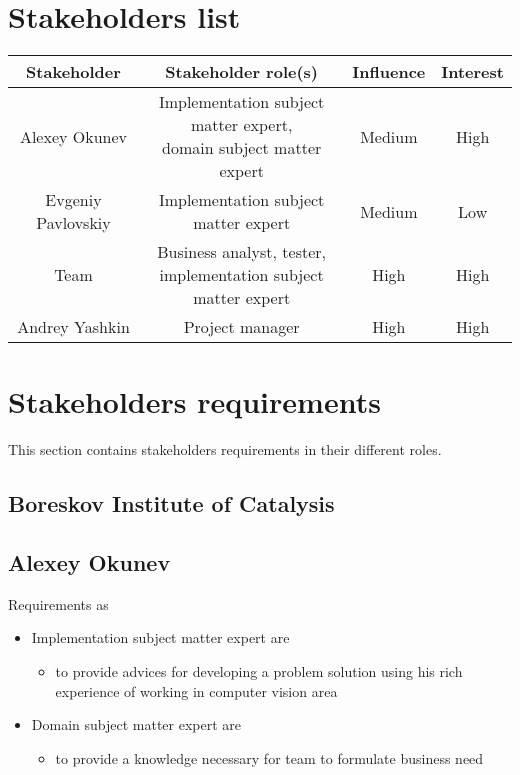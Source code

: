 \section{Stakeholders list}

\begin{tabular}{ | c | c | c | c | }
	\hline
	Stakeholder & Stakeholder role(s) & Influence & Interest \\ \hline
	Alexey Okunev & \specialcell{Implementation subject matter expert, \\ domain subject matter expert} & Medium & High \\ \hline
	Evgeniy Pavlovskiy & Implementation subject matter expert & Medium & Low \\ \hline
	Team &  \specialcell{Business analyst, tester, \\ implementation subject matter expert} & High & High \\ \hline
	Andrey Yashkin & Project manager & High & High \\ \hline
\end{tabular}


\section{Stakeholders requirements}

This section contains stakeholders requirements in their different roles.

\subsection{Boreskov Institute of Catalysis}

\subsection{Alexey Okunev}

Requirements as 
\begin{itemize}
	\item Implementation subject matter expert are
	\begin{itemize}
		\item to provide advices for developing a problem solution using his rich experience of working in computer vision area
	\end{itemize}
	\item Domain subject matter expert are
	\begin{itemize}
		\item to provide a knowledge necessary for team to formulate business need
	\end{itemize}
\end{itemize}

